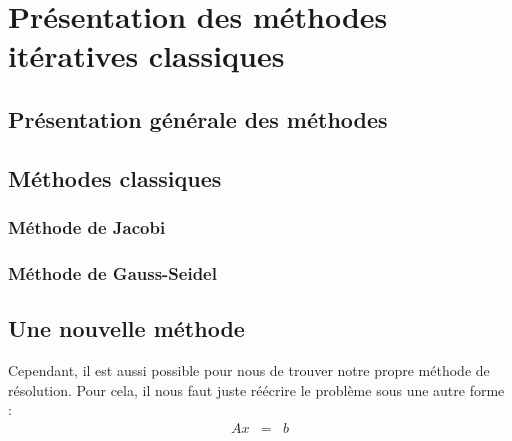 \chapter{Présentation des méthodes itératives classiques}
\section{Présentation générale des méthodes}
\section{Méthodes classiques}
\subsection{Méthode de Jacobi}
\subsection{Méthode de Gauss-Seidel}
\section{Une nouvelle méthode}
Cependant, il est aussi possible pour nous de trouver notre propre méthode de résolution. Pour cela, il nous faut juste réécrire le problème sous une autre forme : 
\begin{eqnarray}
Ax &=& b
\end{eqnarray}